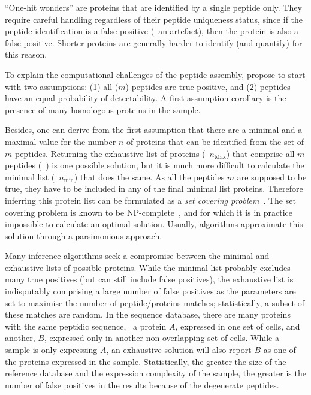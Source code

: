 \enquote{One-hit wonders} are proteins
that are identified by a single peptide only.
They require careful handling regardless of their peptide uniqueness status,
since if the peptide identification is a false positive (\ie\ an artefact),
then the protein is also a false positive.
Shorter proteins are generally harder to identify (and quantify)
for this reason.\mybr\

To explain the computational challenges of the peptide assembly,
\citet{Huang2012-nr} propose to start with two assumptions:
(1) all ($m$) peptides are true positive,
and (2) peptides have an equal probability of detectability.
A first assumption corollary is
the presence of many homologous proteins in the sample.\mybr\

Besides, one can derive from the first assumption
that there are a minimal and a maximal value
for the number $n$ of proteins that can be identified
from the set of $m$ peptides.
Returning the exhaustive list of proteins (\ie\ $n_\text{Max}$)
that comprise all $m$ peptides (\eg\ \citet{Tabb2002-wm}) is one possible solution,
but it is much more difficult to calculate the minimal list
(\ie\ $n_\text{min}$) that does the same.
As all the peptides $m$ are supposed to be true,
they have to be included in any of the final minimal list proteins.
Therefore inferring this protein list can be formulated
as a \emph{set covering problem}~.
The set covering problem is known to be \gls{NP}-complete~,
and for which it is in practice impossible to calculate an optimal solution.
Usually, algorithms approximate this solution through a parsimonious approach.\mybr\

Many inference algorithms seek
a compromise between the minimal and exhaustive lists of possible proteins.
While the minimal list probably excludes many true positives
(but can still include false positives),
the exhaustive list is indisputably comprising a large number of false positives
as the parameters are set to maximise the number of peptide/proteins matches;
statistically, a subset of these matches are random.
In the sequence database,
there are many proteins with the same peptidic sequence,
\eg\ a protein $A$, expressed in one set of cells, and
another, $B$, expressed only in another non-overlapping set of cells.
While a sample is only expressing $A$,
an exhaustive solution will also report
$B$ as one of the proteins expressed in the sample.
Statistically,
the greater the size of the reference database
and the expression complexity of the sample,
the greater is the number of false positives in the results
because of the degenerate peptides.\mybr\

